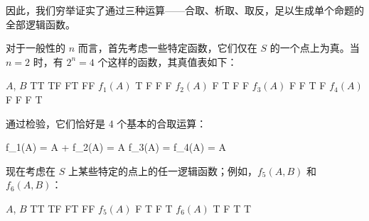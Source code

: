因此，我们穷举证实了通过三种运算——合取、析取、取反，足以生成单个命题的全部逻辑函数。

对于一般性的 $n$ 而言，首先考虑一些特定函数，它们仅在 $S$ 的一个点上为真。当 $n = 2$ 时，有 $2^n = 4$ 个这样的函数，其真值表如下：

{\startxtable
  \startxtablehead[topframe=on, rulethickness=1.5pt]
  \startxrow
  \startxcell[width=2cm] $A$, $B$ \stopxcell
  \startxcell[width=2cm] TT \stopxcell
  \startxcell[width=2cm] TF \stopxcell
  \startxcell[width=2cm] FT \stopxcell
  \startxcell[width=2cm] FF \stopxcell
  \stopxrow
  \stopxtablehead
  \startxtablebody
  \startxrow[topframe=on,rulethickness=0.75pt]
  \startxcell $f_1(A)$ \stopxcell
  \startxcell T \stopxcell
  \startxcell F \stopxcell
  \startxcell F \stopxcell
  \startxcell F \stopxcell
  \stopxrow
  \startxrow
  \startxcell $f_2(A)$ \stopxcell
  \startxcell F \stopxcell
  \startxcell T \stopxcell
  \startxcell F \stopxcell
  \startxcell F \stopxcell
  \stopxrow
  \startxrow
  \startxcell $f_3(A)$ \stopxcell
  \startxcell F \stopxcell
  \startxcell F \stopxcell
  \startxcell T \stopxcell
  \startxcell F \stopxcell
  \stopxrow          
  \stopxtablebody
  \startxtablefoot[bottomframe=on,rulethickness=1.5pt]
  \startxrow
  \startxcell $f_4(A)$ \stopxcell
  \startxcell F \stopxcell
  \startxcell F \stopxcell
  \startxcell F \stopxcell
  \startxcell T \stopxcell
  \stopxrow
  \stopxtablefoot
  \stopxtable
}

通过检验，它们恰好是 4 个基本的合取运算：

\placeformula[1-17]
\startformula
\startalign
\NC f_1(A) \NC = A + \NR
\NC f_2(A) \NC = A\NR
\NC f_3(A) \NC = \NR
\NC f_4(A) \NC = A\NR
\stopalign
\stopformula

现在考虑在 $S$ 上某些特定的点上的任一逻辑函数；例如，$f_5(A, B)$ 和 $f_6(A, B)$：

{\startxtable
  \startxtablehead[topframe=on, rulethickness=1.5pt]
  \startxrow
  \startxcell[width=2cm] $A$, $B$ \stopxcell
  \startxcell[width=2cm] TT \stopxcell
  \startxcell[width=2cm] TF \stopxcell
  \startxcell[width=2cm] FT \stopxcell
  \startxcell[width=2cm] FF \stopxcell
  \stopxrow
  \stopxtablehead
  \startxtablebody
  \startxrow[topframe=on,rulethickness=0.75pt]
  \startxcell $f_5(A)$ \stopxcell
  \startxcell F \stopxcell
  \startxcell T \stopxcell
  \startxcell F \stopxcell
  \startxcell T \stopxcell
  \stopxrow
  \stopxtablebody
  \startxtablefoot[bottomframe=on,rulethickness=1.5pt]
  \startxrow
  \startxcell $f_6(A)$ \stopxcell
  \startxcell T \stopxcell
  \startxcell F \stopxcell
  \startxcell T \stopxcell
  \startxcell T \stopxcell
  \stopxrow
  \stopxtablefoot
  \stopxtable
}


